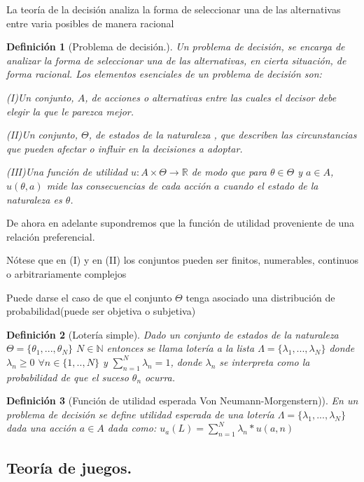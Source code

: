 \documentclass[16pt, a4paper]{article} %
\newcommand{\R}{\ensuremath{\mathbb{R}}}
\newtheorem{definicion}{Definición}[section]
\begin{document}
La teoría de la decisión analiza la forma de seleccionar una de las alternativas entre varia posibles de manera racional
\begin{definicion}[Problema de decisión.]
Un problema de decisión, se encarga de analizar la forma de seleccionar una de las alternativas, en cierta situación, de forma racional.
Los elementos esenciales de un problema de decisión son:
  
  (I)Un conjunto, $A$, de acciones o alternativas entre las cuales el decisor debe elegir la que le parezca mejor.
  
  (II)Un conjunto, $\Theta$, de estados de la naturaleza , que describen las circunstancias que pueden afectar o influir en la decisiones a adoptar.
  
(III)Una función de utilidad $u:A \times  \Theta \to \R$ de modo que  para $\theta \in \Theta $ y $a \in A$, $u(\theta , a)$ mide las consecuencias de cada acción $a$ cuando el estado de la naturaleza es $\theta$.
\end{definicion}

   
De ahora en adelante supondremos que la función de utilidad proveniente de una relación preferencial.
 
Nótese que en (I) y en (II) los conjuntos pueden ser finitos, numerables, continuos o arbitrariamente complejos

Puede darse el caso de que el conjunto $\Theta$ tenga asociado una distribución de probabilidad(puede ser objetiva o subjetiva)
\begin{definicion}[Lotería simple]
Dado un conjunto de estados de la naturaleza $\Theta =\{ \theta_1,...,\theta_N \} $ $N \in \mathbb{N}$ entonces se llama lotería a la lista $\Lambda =\{ \lambda_1,...,\lambda_N\} $ donde $\lambda_n \ge 0$ $\forall n \in \{ 1,..,N\} $ y $\sum_{n=1}^{N} \lambda_n=1$, donde $\lambda_n$ se interpreta como la probabilidad de que el suceso $\theta_n$ ocurra.
\end{definicion}


\begin{definicion}[Función de utilidad esperada Von Neumann-Morgenstern)]
En un problema de decisión se define utilidad esperada de una lotería $ \Lambda =\{ \lambda_1,...,\lambda_N\} $ dada una acción $a \in A$ dada  como:
$u_a(L)=\sum_{n=1}^{N}\lambda_n*u(a,n)$

\end{definicion}

\subsection{Teoría de juegos.}
\end{document}
